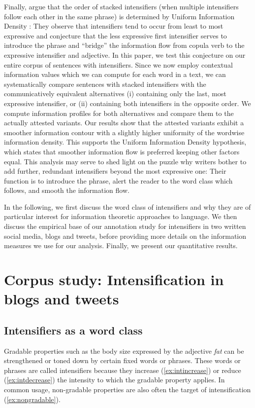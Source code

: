 \documentclass[output=paper,colorlinks,citecolor=brown]{langscibook}
\begin{document}
Finally, \citet{scherihou2022} argue that the order of stacked intensifiers (when multiple intensifiers follow each other in the same phrase) is determined by Uniform Information Density \citep{fenk1980konstanz, aylett2004smooth, levy2007speakers, jaeger2010redundancy}: They observe that intensifiers tend to occur from least to most expressive and conjecture that the less expressive first intensifier serves to introduce the phrase and ``bridge'' the information flow from copula verb to the expressive intensifier and adjective. In this paper, we  test this conjecture on our entire corpus of sentences with intensifiers. Since we now employ contextual information values which we can compute for each word in a text, we can systematically compare sentences with stacked intensifiers with the communicatively equivalent alternatives (i) containing only the last, most expressive intensifier, or (ii) containing both intensifiers in the opposite order. We compute information profiles for both alternatives and compare them to the actually attested variants. Our results show that the attested variants exhibit a smoother information contour with a slightly higher uniformity of the wordwise information density. This supports the Uniform Information Density hypothesis, which states that smoother information flow is preferred keeping other factors equal. This analysis may serve to shed light on the puzzle why writers bother to add further, redundant intensifiers beyond the most expressive one: Their function is to introduce the phrase, alert the reader to the word class which follows, and smooth the information flow.


In the following, we first discuss the word class of intensifiers and why they are of particular interest for information theoretic approaches to language. We then discuss the empirical base of our annotation study for intensifiers in two written social media, blogs and tweets, before providing more details on the information measures we use for our analysis. Finally, we present our quantitative results.

\section{Corpus study: Intensification in blogs and tweets}
\subsection{Intensifiers as a word class}\label{sec:intensifiers}
Gradable properties such as the body size expressed by the adjective \textit{fat} can be strengthened or toned down by certain fixed words or phrases. These words or phrases are called intensifiers because they increase (\ref{ex:intincrease}) or reduce (\ref{ex:intdecrease}) the intensity to which the gradable property applies. In common usage, non-gradable properties are also often the target of intensification (\ref{ex:nongradable}).
\end{document}

